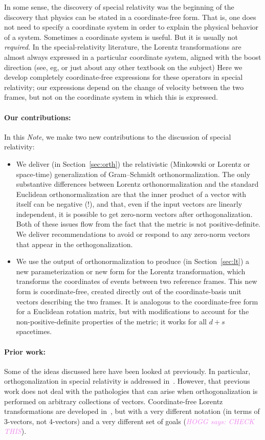 \documentclass{article}
\newcommand{\plus}{\!+\!} %
\newcommand{\documentname}{\textsl{Note}}
\newcommand{\secref}[1]{Section~\ref{#1}}
\newcommand{\HOGG}[1]{\textcolor{violet}{\textsl{HOGG says: {#1}}}}
\begin{document}
In some sense, the discovery of special relativity was the beginning of the discovery that physics can be stated in a coordinate-free form.
That is, one does not need to specify a coordinate system in order to explain the physical behavior of a system.
Sometimes a coordinate system is useful.
But it is usually not \emph{required}.
In the special-relativity literature, the Lorentz transformations are almost always expressed in a particular coordinate system, aligned with the boost direction (see, eg, \cite{french, zakamska} or just about any other textbook on the subject)
Here we develop completely coordinate-free expressions for these operators in special relativity; our expressions depend on the change of velocity between the two frames, but not on the coordinate system in which this is expressed.

\paragraph{Our contributions:}
In this \documentname, we make two new contributions to the discussion of special relativity:
\begin{itemize}
\item
We deliver (in \secref{sec:orth}) the relativistic (Minkowski or Lorentz or space-time) generalization of Gram--Schmidt orthonormalization.
The only substantive differences between Lorentz orthonormalization and the standard Euclidean orthonormalization are that the inner product of a vector with itself can be negative (!), and that, even if the input vectors are linearly independent, it is possible to get zero-norm vectors after orthogonalization.
Both of these issues flow from the fact that the metric is not positive-definite.
We deliver recommendations to avoid or respond to any zero-norm vectors that appear in the orthogonalization.
\item
We use the output of orthonormalization to produce (in \secref{sec:lt}) a new parameterization or new form for the Lorentz transformation, which transforms the coordinates of events between two reference frames.
This new form is coordinate-free, created directly out of the coordinate-basis unit vectors describing the two frames.
It is analogous to the coordinate-free form for a Euclidean rotation matrix, but with modifications to account for the non-positive-definite properties of the metric; it works for all $d\plus s$ spacetimes.
\end{itemize}

\paragraph{Prior work:}
Some of the ideas discussed here have been looked at previously.
In particular, orthogonalization in special relativity is addressed in~\cite{joot}.
However, that previous work does not deal with the pathologies that can arise when orthogonalization is performed on arbitrary collections of vectors.
Coordinate-free Lorentz transformations are developed in~\cite{wagner}, but with a very different notation (in terms of 3-vectors, not 4-vectors) and a very different set of goals (\HOGG{CHECK THIS}).
\end{document}
